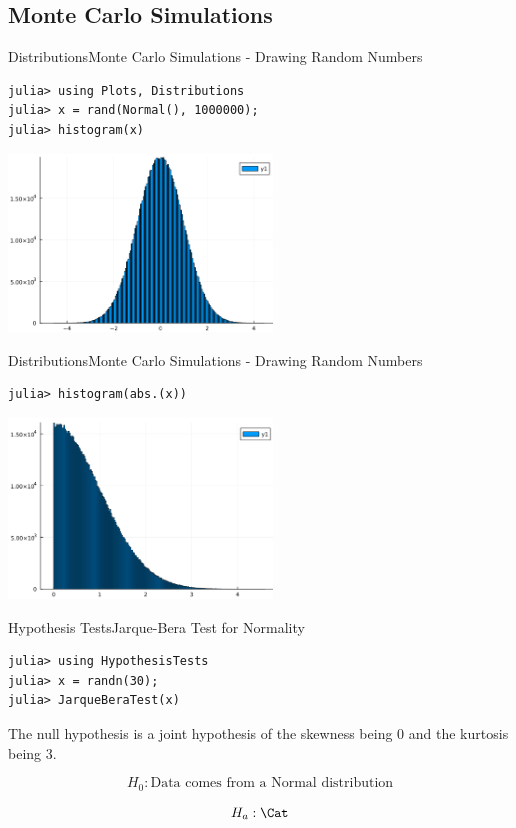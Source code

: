 \documentclass[11pt]{beamer}
\begin{document}
\subsection{Monte Carlo Simulations}
\begin{frame}[fragile]{Distributions}{Monte Carlo Simulations - Drawing Random Numbers}
\begin{lstlisting}
julia> using Plots, Distributions
julia> x = rand(Normal(), 1000000);
julia> histogram(x)
\end{lstlisting}
\begin{center}
\includegraphics[width=7cm]{images/histogram.png}
\end{center}
\end{frame}

\begin{frame}[fragile]{Distributions}{Monte Carlo Simulations - Drawing Random Numbers}
	\begin{lstlisting}
julia> histogram(abs.(x))
	\end{lstlisting}
	\begin{center}
		\includegraphics[width=7cm]{images/hist-abs-x.png}
	\end{center}
\end{frame}



\begin{frame}[fragile]{Hypothesis Tests}{Jarque-Bera Test for Normality}
\begin{lstlisting}
julia> using HypothesisTests
julia> x = randn(30);
julia> JarqueBeraTest(x)
\end{lstlisting}

The null hypothesis is a joint hypothesis of the skewness being $0$ and the kurtosis being $3$. 

$$
H_0: \text{Data comes from a Normal distribution}
$$

$$
H_a: \text{\Cat}
$$

\end{frame}
\end{document}
